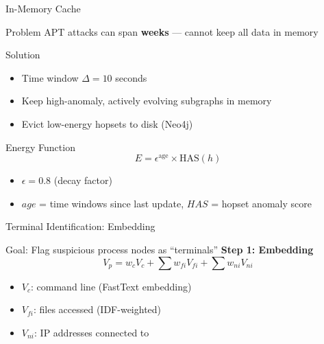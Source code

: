\documentclass[11pt, aspectratio=169]{beamer}
\begin{document}
\begin{frame}{In-Memory Cache}
    \begin{block}{Problem}
        APT attacks can span \textbf{weeks} — cannot keep all data in memory
    \end{block}

    \begin{exampleblock}{Solution}
        \begin{itemize}
            \item Time window $\Delta = 10$ seconds
            \item Keep high-anomaly, actively evolving subgraphs in memory
            \item Evict low-energy hopsets to disk (Neo4j)
        \end{itemize}
    \end{exampleblock}

    \begin{block}{Energy Function}
        \[
        E = \epsilon^{\text{age}} \times \text{HAS}(h)
        \]
        \begin{itemize}
            \item $\epsilon = 0.8$ (decay factor)
            \item $age$ = time windows since last update, $HAS$ = hopset anomaly score
        \end{itemize}
    \end{block}
\end{frame}

\begin{frame}{Terminal Identification: Embedding}
    \begin{block}{Goal: Flag suspicious process nodes as ``terminals''}
        \textbf{Step 1: Embedding}
        \[
        V_p = w_c V_c + \sum w_{fi} V_{fi} + \sum w_{ni} V_{ni}
        \]
        \begin{itemize}
            \item $V_c$: command line (FastText embedding)
            \item $V_{fi}$: files accessed (IDF-weighted)
            \item $V_{ni}$: IP addresses connected to
        \end{itemize}
    \end{block}

\end{frame}
\end{document}
